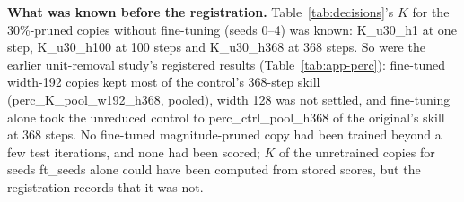 \textbf{What was known before the registration.} Table~\ref{tab:decisions}'s $K$ for the 30\%-pruned copies without
fine-tuning (seeds 0--4) was known: {{K_u30_h1}} at one step, {{K_u30_h100}} at 100 steps and {{K_u30_h368}} at 368
steps. So were the earlier unit-removal study's registered results (Table~\ref{tab:app-perc}): fine-tuned width-192
copies kept most of the control's 368-step skill ({{perc_K_pool_w192_h368}}, pooled), width 128 was not settled, and
fine-tuning alone took the unreduced control to {{perc_ctrl_pool_h368}} of the original's skill at 368 steps. No
fine-tuned magnitude-pruned copy had been trained beyond a few test iterations, and none had been scored; $K$ of the
unretrained copies for seeds {{ft_seeds}} alone could have been computed from stored scores, but the registration
records that it was not.

\FloatBarrier
